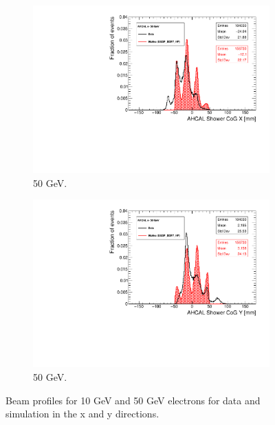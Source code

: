 \begin{figure}[htbp!]
\begin{subfigure}[t]{0.49\textwidth}
    \includegraphics[width=1.\linewidth]{../Thesis_Plots/Timing/Electrons/Plots/Run24405_CoGX_AHCAL_50GeV_Comparison.pdf}
    \caption{50 GeV.} \label{fig:e50GeVX}
  \end{subfigure}
  \hfill
  \begin{subfigure}[t]{0.49\textwidth}
    \includegraphics[width=1.\linewidth]{../Thesis_Plots/Timing/Electrons/Plots/Run24405_CoGY_AHCAL_50GeV_Comparison.pdf}
    \caption{50 GeV.} \label{fig:e50GeVY}
  \end{subfigure}
  \caption{Beam profiles for 10 GeV and 50 GeV electrons for data and simulation in the x and y directions.}
  \label{fig:BPe}
\end{figure}

